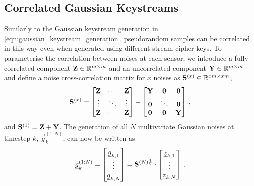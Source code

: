 % 
% 

\subsection{Correlated Gaussian Keystreams}\label{subsec:priv_estimation:fus_gaussian_keystreams}
Similarly to the Gaussian keystream generation in [eqn:gaussian\_keystream\_generation], pseudorandom samples can be correlated in this way even when generated using different stream cipher keys. To parameterise the correlation between noises at each sensor, we introduce a fully correlated component ${{\mathbf{Z}}}\in\mathbb{R}^{m\times m}$ and an uncorrelated component ${{\mathbf{Y}}}\in\mathbb{R}^{m\times m}$ and define a noise cross-correlation matrix for $x$ noises as ${{\mathbf{S}}}^{(x)} \in \mathbb{R}^{xm\times xm}$,
\begin{equation}\label{eqn:noise_correlation_matrix}
  {\ensuremath{{\mathbf{S}}}}^{(x)}=
  \begin{bmatrix}
    {\ensuremath{{\mathbf{Z}}}} & \cdots & {{\mathbf{Z}}}\\
    \vdots & \ddots & \vdots\\
    {{\mathbf{Z}}} & \cdots & {{\mathbf{Z}}}\\
  \end{bmatrix}+
  \begin{bmatrix}
    {\ensuremath{{\mathbf{Y}}}} & {{\mathbf{0}}} & {{\mathbf{0}}}\\
    {{\mathbf{0}}} & \ddots & {{\mathbf{0}}}\\
    {{\mathbf{0}}} & {{\mathbf{0}}} & {{\mathbf{Y}}}\\
  \end{bmatrix}\,,
\end{equation}
and ${{\mathbf{S}}}^{(1)}={{\mathbf{Z}}}+{{\mathbf{Y}}}$. The generation of all $N$ multivariate Gaussian noises at timestep $k$, $\vec{g}_k^{(1:N)}$, can now be written as
\begin{equation}\label{eqn:all_correlated_noises_generation}
  {\underline{g}}_k^{(1:N)}=
  \begin{bmatrix}
    {\underline{g}}_{k,1}\\
    \vdots\\
    {\underline{g}}_{k,N}
  \end{bmatrix}=
  {{\mathbf{S}}}^{(N)\frac{1}{2}}\cdot
  \begin{bmatrix}
    {\underline{z}}_{k,1}\\
    \vdots\\
    {\underline{z}}_{k,N}
  \end{bmatrix}\,,
\end{equation}
